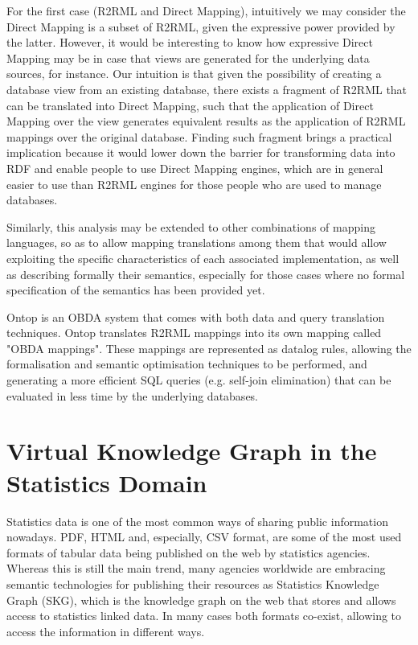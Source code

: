 For the first case (R2RML and Direct Mapping), intuitively we may consider the Direct Mapping is a subset of R2RML, given the expressive power provided by the latter. However, it would be interesting to know how expressive Direct Mapping may be in case that views are generated for the underlying data sources, for instance. Our intuition is that given the possibility of creating a database view from an existing database, there exists a fragment of R2RML that can be translated into Direct Mapping, such that the application of Direct Mapping over the view generates equivalent results as the application of R2RML mappings over the original database. Finding such fragment brings a practical implication because it would lower down the barrier for transforming data into RDF and enable people to use Direct Mapping engines, which are in general easier to use than R2RML engines for those people who are used to manage databases.

Similarly, this analysis may be extended to other combinations of mapping languages, so as to allow mapping translations among them that would allow exploiting the specific characteristics of each associated implementation, as well as describing formally their semantics, especially for those cases where no formal specification of the semantics has been provided yet.

Ontop \citep{rodriguez2015efficient} is an OBDA system that comes with both data and query translation techniques. Ontop translates R2RML mappings into its own mapping called "OBDA mappings". These mappings are represented as datalog rules, allowing the formalisation and semantic optimisation techniques to be performed, and generating a more efficient SQL queries (e.g. self-join elimination) that can be evaluated in less time by the underlying databases.



\section{Virtual Knowledge Graph in the Statistics Domain}

Statistics data is one of the most common ways of sharing public information nowadays. PDF, HTML and, especially, CSV format, are some of the most used formats of tabular data being published on the web by statistics agencies. Whereas this is still the main trend, many agencies worldwide are embracing semantic technologies for publishing their resources as Statistics Knowledge Graph (SKG), which is the knowledge graph on the web that stores and allows access to statistics linked data. In many cases both formats co-exist, allowing to access the information in different ways. %

